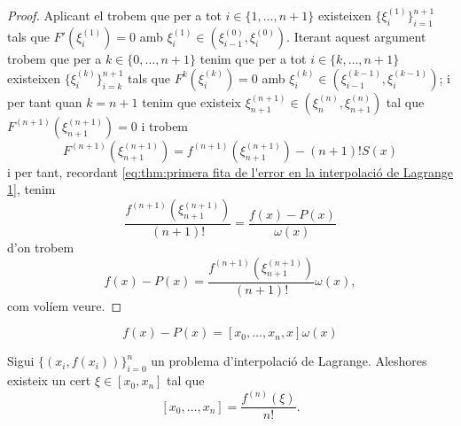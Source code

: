 \documentclass[../Apunts.tex]{subfiles}
\begin{document}
\begin{theorem}
\begin{proof}
			Aplicant el  trobem que per a tot \(i\in\{1,\dots,n+1\}\) existeixen \(\{\xi^{(1)}_{i}\}_{i=1}^{n+1}\) tals que \(F'(\xi^{(1)}_{i})=0\) amb \(\xi^{(1)}_{i}\in(\xi^{(0)}_{i-1},\xi^{(0)}_{i})\). Iterant aquest argument trobem que per a \(k\in\{0,\dots,n+1\}\) tenim que per a tot \(i\in\{k,\dots,n+1\}\) existeixen \(\{\xi^{(k)}_{i}\}_{i=k}^{n+1}\) tals que \(F^{k}(\xi^{(k)}_{i})=0\) amb \(\xi^{(k)}_{i}\in(\xi^{(k-1)}_{i-1},\xi^{(k-1)}_{i})\); i per tant quan \(k=n+1\) tenim que existeix \(\xi^{(n+1)}_{n+1}\in(\xi^{(n)}_{n},\xi^{(n)}_{n+1})\) tal que \(F^{(n+1)}(\xi^{(n+1)}_{n+1})=0\) i trobem
			\[F^{(n+1)}(\xi^{(n+1)}_{n+1})=f^{(n+1)}(\xi^{(n+1)}_{n+1})-(n+1)!S(x)\]%
			i per tant, recordant \eqref{eq:thm:primera fita de l'error en la interpolació de Lagrange 1}, tenim
			\[\frac{f^{(n+1)}(\xi^{(n+1)}_{n+1})}{(n+1)!}=\frac{f(x)-P(x)}{\omega(x)}\]
			d'on trobem
			\[f(x)-P(x)=\frac{f^{(n+1)}(\xi^{(n+1)}_{n+1})}{(n+1)!}\omega(x),\]
			com volíem veure.
		\end{proof}
	\end{theorem}
	\begin{observation}
		\[f(x)-P(x)=[x_{0},\dots,x_{n},x]\omega(x)\]
	\end{observation}
	\begin{corollary}
		Sigui \(\{(x_{i},f(x_{i}))\}_{i=0}^{n}\) un problema d'interpolació de Lagrange. Aleshores existeix un cert \(\xi\in[x_{0},x_{n}]\) tal que
		\[[x_{0},\dots,x_{n}]=\frac{f^{(n)}(\xi)}{n!}.\]
	\end{corollary}
\end{document}
